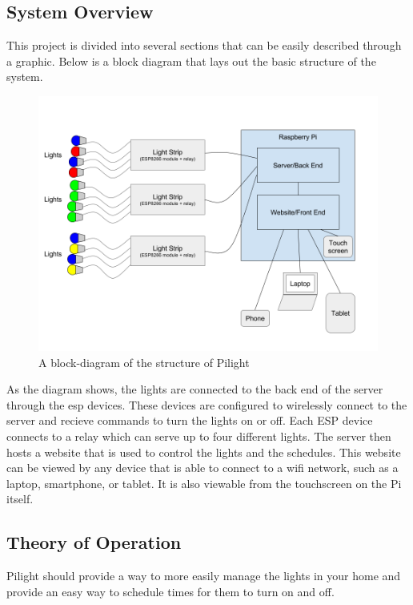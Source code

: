 \subsection{System Overview}
This project is divided into several sections that can be easily described through a graphic. Below is a block diagram that lays out the basic structure of the system.\\
\begin{figure}[h!]
   \includegraphics[width=1.0\textwidth]{block-diagram.png}
   \caption{A block-diagram of the structure of Pilight}
\end{figure}
As the diagram shows, the lights are connected to the back end of the server through the esp devices. These devices are configured to wirelessly connect to the server and recieve commands to turn the lights on or off. Each ESP device connects to a relay which can serve up to four different lights. The server then hosts a website that is used to control the lights and the schedules. This website can be viewed by any device that is able to connect to a wifi network, such as a laptop, smartphone, or tablet. It is also viewable from the touchscreen on the Pi itself.
\subsection{Theory of Operation}
Pilight should provide a way to more easily manage the lights in your home and provide an easy way to schedule times for them to turn on and off. 